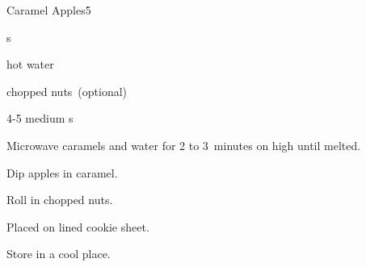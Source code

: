 \begin{recipe}{Caramel Apples}{}{5}

\begin{ingredients}
\item {} s
\item {} hot water
\item chopped nuts~(optional)
\item 4-5 medium s
\end{ingredients}

\begin{directions}
\item Microwave caramels and water for 2 to 3~minutes on high until melted.
\item Dip apples in caramel.
\item Roll in chopped nuts.
\item Placed on lined cookie sheet.
\item Store in a cool place.
\end{directions}

\end{recipe}
